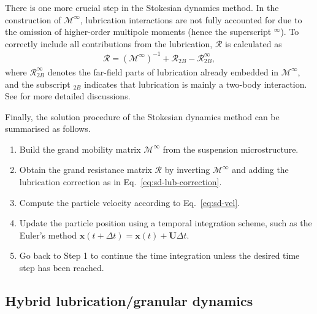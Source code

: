 There is one more crucial step in the Stokesian dynamics method.
In the construction of $\mathscr{M}^\infty$, lubrication interactions are not fully accounted for due to the omission of higher-order multipole moments (hence the superscript $^\infty$). To correctly include all contributions from the lubrication, $\mathscr{R}$ is calculated as
\begin{equation} \label{eq:sd-lub-correction}
 \begin{aligned}
  \mathscr{R} = (\mathscr{M}^\infty)^{-1} +\mathscr{R}_{2B} - \mathscr{R}_{2B}^\infty,
 \end{aligned}
\end{equation}
where $\mathscr{R}_{2B}^\infty$ denotes the far-field parts of lubrication already embedded in $\mathscr{M}^\infty$, and the subscript $_{2B}$ indicates that lubrication is mainly a two-body interaction. See \cite{durlofsky_brady_bossis_1987, Brady_Bossis1988} for more detailed discussions.  

Finally, the solution procedure of the Stokesian dynamics method can be summarised as follows.
\begin{enumerate}
\item Build the grand mobility matrix $\mathscr{M}^\infty$ from the suspension microstructure.
\item Obtain the grand resistance matrix $\mathscr{R}$ by inverting $\mathscr{M}^\infty$ and adding the lubrication correction as in Eq.\ \eqref{eq:sd-lub-correction}.
\item Compute the particle velocity according to Eq.\ \eqref{eq:sd-vel}.
\item Update the particle position using a temporal integration scheme, such as the Euler's method $\bm{x}(t+\Delta t)= \bm{x}(t) +\bm{U} \Delta t$.
\item Go back to Step 1 to continue the time integration unless the desired time step has been reached.
\end{enumerate}


\subsection{Hybrid lubrication/granular dynamics}

